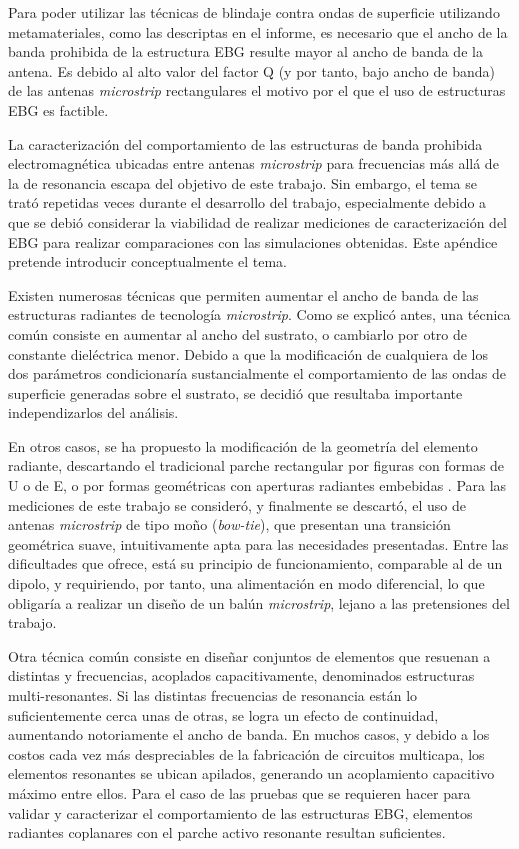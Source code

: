 Para poder utilizar las técnicas de blindaje contra ondas de superficie utilizando metamateriales, como las descriptas en el informe, es necesario que el ancho de la banda prohibida de la estructura EBG resulte mayor al ancho de banda de la antena. Es debido al alto valor del factor Q (y por tanto, bajo ancho de banda) de las antenas \textit{microstrip} rectangulares el motivo por el que el uso de estructuras EBG es factible.

La caracterización del comportamiento de las estructuras de banda prohibida electromagnética ubicadas entre antenas \textit{microstrip} para frecuencias más allá de la de resonancia escapa del objetivo de este trabajo. Sin embargo, el tema se trató repetidas veces durante el desarrollo del trabajo, especialmente debido a que se debió considerar la viabilidad de realizar mediciones de caracterización del EBG para realizar comparaciones con las simulaciones obtenidas. Este apéndice pretende introducir conceptualmente el tema.

Existen numerosas técnicas que permiten aumentar el ancho de banda de las estructuras radiantes de tecnología \textit{microstrip}. Como se explicó antes, una técnica común consiste en aumentar al ancho del sustrato, o cambiarlo por otro de constante dieléctrica menor. Debido a que la modificación de cualquiera de los dos parámetros condicionaría sustancialmente el comportamiento de las ondas de superficie generadas sobre el sustrato, se decidió que resultaba importante independizarlos del análisis.

En otros casos, se ha propuesto la modificación de la geometría del elemento radiante, descartando el tradicional parche rectangular por figuras con formas de U o de E, o por formas geométricas con aperturas radiantes embebidas \cite{Yang:EBGAntennas}. Para las mediciones de este trabajo se consideró, y finalmente se descartó, el uso de antenas \textit{microstrip} de tipo moño (\textit{bow-tie}), que presentan una transición geométrica suave, intuitivamente apta para las necesidades presentadas. Entre las dificultades que ofrece, está su principio de funcionamiento, comparable al de un dipolo, y requiriendo, por tanto, una alimentación en modo diferencial, lo que obligaría a realizar un diseño de un balún \textit{microstrip}, lejano a las pretensiones del trabajo.

Otra técnica común consiste en diseñar conjuntos de elementos que resuenan a distintas y frecuencias, acoplados capacitivamente, denominados estructuras multi-resonantes. Si las distintas frecuencias de resonancia están lo suficientemente cerca unas de otras, se logra un efecto de continuidad, aumentando notoriamente el ancho de banda. En muchos casos, y debido a los costos cada vez más despreciables de la fabricación de circuitos multicapa, los elementos resonantes se ubican apilados, generando un acoplamiento capacitivo máximo entre ellos. Para el caso de las pruebas que se requieren hacer para validar y caracterizar el comportamiento de las estructuras EBG, elementos radiantes coplanares con el parche activo resonante resultan suficientes.


